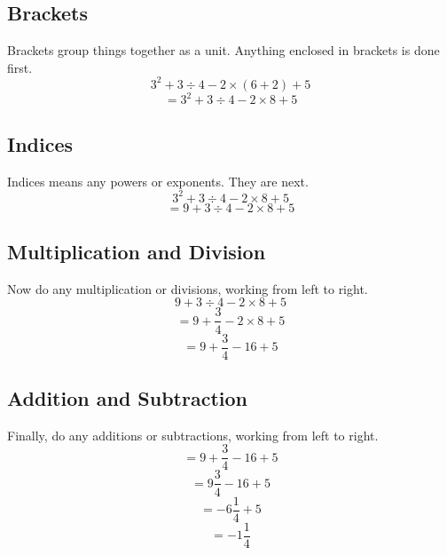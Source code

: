 \documentclass[12pt]{article}
\begin{document}
\subsection*{Brackets}

Brackets group things together as a unit. Anything enclosed in brackets is done first.\\

$$  3^2 + 3 \div 4 - 2 \times (6 + 2) + 5$$
$$= 3^2 + 3 \div 4 - 2 \times 8 + 5$$

\subsection*{Indices}

Indices means any powers or exponents. They are next.\\

$$  3^2 + 3 \div 4 - 2 \times 8 + 5$$
$$= 9 + 3 \div 4 - 2 \times 8 + 5$$

\subsection*{Multiplication and Division}

Now do any multiplication or divisions, working from left to right.\\

$$  9 + 3 \div 4 - 2 \times 8 + 5$$
$$= 9 + \frac{3}{4} - 2 \times 8 + 5$$
$$= 9 + \frac{3}{4} - 16 + 5$$

\subsection*{Addition and Subtraction}
Finally, do any additions or subtractions, working from left to right.\\

$$= 9 + \frac{3}{4} - 16 + 5$$
$$= 9 \frac{3}{4} - 16 + 5$$
$$= -6 \frac{1}{4} + 5$$
$$= -1 \frac{1}{4}$$

\newpage
\end{document}
